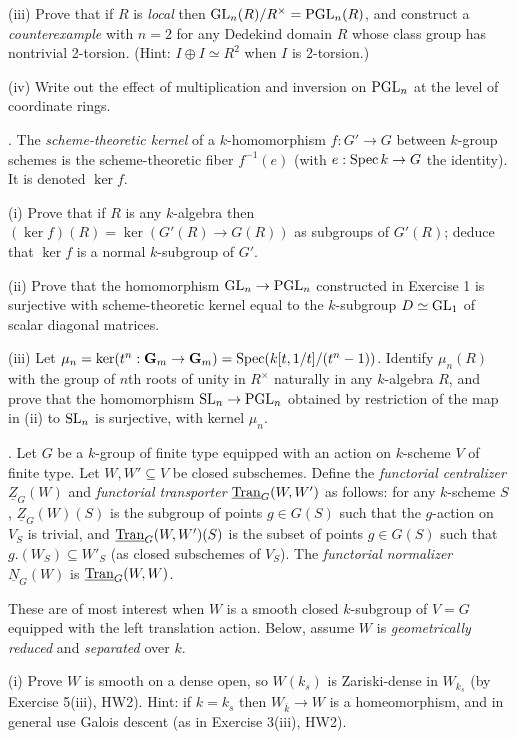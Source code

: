 \documentclass[10pt]{amsart}
\def\Spec{\mathop{\rm Spec}}
\begin{document}
(iii) Prove that if $R$ is {\em local} then ${\rm{GL}}_n(R)/R^{\times} = 
{\rm{PGL}}_n(R)$, and construct a {\em counterexample} with $n = 2$
for any Dedekind domain $R$ whose class group has nontrivial 2-torsion.
(Hint: $I \oplus I \simeq R^2$ when $I$ is 2-torsion.) 

(iv) Write out the effect of multiplication and inversion on ${\rm{PGL}}_n$ at the level of coordinate rings.

\medskip{}.  The {\em scheme-theoretic kernel} of a $k$-homomorphism
$f:G' \rightarrow G$ between $k$-group schemes is the scheme-theoretic fiber $f^{-1}(e)$
(with $e:\Spec k \rightarrow G$ the identity). It is denoted $\ker f$.

(i) Prove that if $R$ is any $k$-algebra then $(\ker f)(R) = \ker(G'(R) \rightarrow G(R))$
as subgroups of $G'(R)$; deduce that $\ker f$ is a normal $k$-subgroup of $G'$. 

(ii) Prove that the homomorphism ${\rm{GL}}_n \rightarrow {\rm{PGL}}_n$
constructed in Exercise 1 is surjective with scheme-theoretic kernel equal to the $k$-subgroup
$D \simeq {\rm{GL}}_1$ of scalar diagonal matrices.

(iii) Let $\mu_n = \ker(t^n:\mathbf{G}_m \rightarrow \mathbf{G}_m) = 
\Spec(k[t,1/t]/(t^n - 1))$.  Identify $\mu_n(R)$ with the group of $n$th roots of unity
in $R^{\times}$ naturally in any $k$-algebra $R$, and 
prove that the homomorphism ${\rm{SL}}_n \rightarrow {\rm{PGL}}_n$
obtained by restriction of the map in (ii) to ${\rm{SL}}_n$ is surjective,
with kernel $\mu_n$.

\medskip{}.  Let $G$ be a $k$-group of finite type equipped with an action on 
$k$-scheme $V$ of finite type.   Let $W, W' \subseteq V$ be closed
subschemes.   Define the {\em functorial centralizer}
$\underline{Z}_G(W)$ and {\em functorial transporter}
$\underline{\rm{Tran}}_G(W,W')$ as follows:  for any $k$-scheme $S$,
$\underline{Z}_G(W)(S)$ is the subgroup of points $g \in G(S)$
such that the $g$-action on $V_S$ is trivial, 
and $\underline{\rm{Tran}}_G(W,W')(S)$ is the subset of points $g \in G(S)$
such that $g.(W_S) \subseteq W'_S$ (as closed subschemes of
$V_S$).   The {\em functorial normalizer}
$\underline{N}_G(W)$ is $\underline{\rm{Tran}}_G(W,W)$.

These are of most interest when $W$ is a smooth closed $k$-subgroup of $V = G$
equipped with the left translation action.  Below, assume $W$ is {\em geometrically reduced} and {\em separated} over $k$.

(i) Prove $W$ is smooth on a dense open, so $W(k_s)$ is Zariski-dense in $W_{k_s}$
(by Exercise 5(iii), HW2).  Hint: if $k = k_s$ then $W_{\overline{k}} \rightarrow W$ is a homeomorphism,
and in general use Galois descent (as in Exercise 3(iii), HW2).
\end{document}
